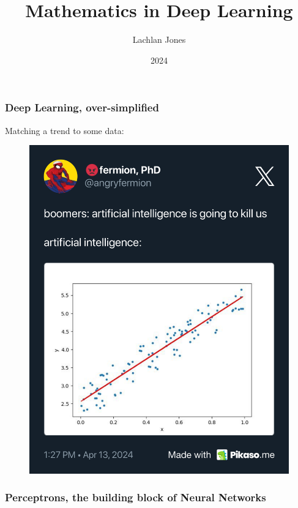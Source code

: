 \documentclass{beamer}
\title{Mathematics in Deep Learning}
\author{Lachlan Jones}
\institute{Math199}
\date{2024}
\begin{document}
\frame{\titlepage}

\begin{frame}
    \frametitle{Deep Learning, over-simplified}
    Matching a trend to some data:
    \begin{figure}
        \centering
        \includegraphics[height=0.75\textheight]{pikaso.me-angryfermion-20240413_132756-1779139460174676132.png}
    \end{figure}
\end{frame}

\begin{frame}
    \frametitle{Perceptrons, the building block of Neural Networks}
\end{frame}

\end{document}
